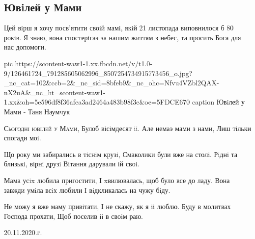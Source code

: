  
 
 

\subsection{Ювiлей у Мами}
\label{sec:20_11_2020.fb.manya_naumchuk.1.juvilej_u_mamy}

Цей вiрш я хочу посв'ятити своiй мамi, якiй 21 листопада виповнилося б 80
рокiв.  Я знаю, вона спостерiгаэ за нашим життям з небес, та просить Бога для
нас допомоги.

\ifcmt
pic https://scontent-waw1-1.xx.fbcdn.net/v/t1.0-9/126461724_791285605062996_8507254734915773456_o.jpg?_nc_cat=102&ccb=2&_nc_sid=8bfeb9&_nc_ohc=Nfvu4VZbl2QAX-nX2uA&_nc_ht=scontent-waw1-1.xx&oh=5e596df8f36afea3ad2464a483b98f3e&oe=5FDCE670
caption Ювiлей у Мами - Таня Наумчук
\fi

\begin{multicols}{2}
\obeycr
\lettrine[lines=2]{С}{ьогоднi ювiлей у Мами},
Булоб вiсiмдесят ii.
Але немаэ мами з нами,
Лиш тiльки спогади моi.

Що року ми забирались в тiснiм крузi,
Смаколики були вже на столi.
Рiднi та близькi, вiрнi друзi
Вiтання дарували iй своi.
\columnbreak

Мама усix любила пригостити,
I xвилювалась, щоб було все до ладу.
Вона завжди умiла всiх любили
I вiдкликалась на чужу бiду.

Не можу я вже маму привiтати,
I не скажу, як я ii люблю.
Буду в молитвах Господа прохати,
Щоб поселив ii в своiм раю.

20.11.2020.г.

\restorecr
\end{multicols}
